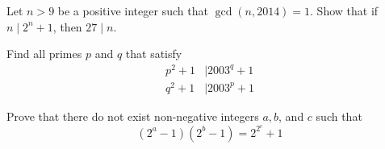 \begin{problem}
	Let $n>9$ be a positive integer such that $\gcd(n,2014)=1$. Show that if $n \mid 2^n+1$, then $27 \mid n$. %
\end{problem}

%

\begin{problem}
	Find all primes $p$ and $q$ that satisfy
		\begin{align*}
			p^2+1
				& \mid 2003^q+1\\
			q^2+1
				& \mid 2003^p+1
		\end{align*}
\end{problem}

\begin{problem}
	Prove that there do not exist non-negative integers $a,b$, and $c$ such that $$(2^a-1)(2^b-1)=2^{2^c}+1$$ %
\end{problem}

%

